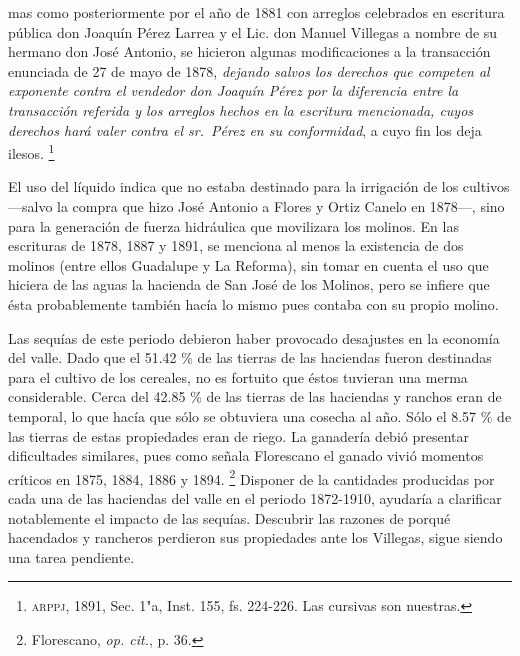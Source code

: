 \documentclass[14pt,twoside,final]{extbook} %
\let\oldfootnote\footnote
\renewcommand\footnote[1]{%
\oldfootnote{\hspace{1mm}#1}}
\begin{document}
\begin{quoting}
mas como posteriormente por el año de 1881 con arreglos celebrados en escritura pública don Joaquín Pérez Larrea y el Lic. don Manuel Villegas a nombre de su hermano don José Antonio, se hicieron algunas modificaciones a la transacción enunciada de 27 de mayo de 1878, \emph{dejando salvos los derechos que competen al exponente contra el vendedor don Joaquín Pérez por la diferencia entre la transacción referida y los arreglos hechos en la escritura mencionada, cuyos derechos hará valer contra el sr.~Pérez en su conformidad}, a cuyo fin los deja ilesos.\footnote{\textsc{arppj}, 1891, Sec. 1"a, Inst. 155, fs. 224-226. Las cursivas son nuestras.}
\end{quoting}
El uso del líquido indica que no estaba destinado para la irrigación de los cultivos ---salvo la compra que hizo José Antonio a Flores y Ortiz Canelo en 1878---, sino para la generación de fuerza hidráulica que movilizara los molinos. En las escrituras de 1878, 1887 y 1891, se menciona al menos la existencia de dos molinos (entre ellos Guadalupe y La Reforma), sin tomar en cuenta el uso que hiciera de las aguas la hacienda de San José de los Molinos, pero se infiere que ésta probablemente
también hacía lo mismo pues contaba con su propio molino.

Las sequías de este periodo debieron haber provocado desajustes en la economía del valle. Dado que el 51.42 \% de las tierras de las haciendas fueron destinadas para el cultivo de los cereales, no es fortuito que éstos tuvieran una merma considerable. Cerca del 42.85 \% de las tierras de las haciendas y ranchos eran de temporal, lo que hacía que sólo se obtuviera una cosecha al año. Sólo el 8.57 \% de las tierras de estas propiedades eran de riego. La ganadería debió presentar dificultades similares, pues como señala Florescano el ganado vivió momentos críticos en 1875, 1884, 1886 y 1894.\footnote{Florescano, \emph{op. cit.}, p. 36.} Disponer de la cantidades producidas por cada una de las haciendas del valle en el periodo 1872-1910, ayudaría a clarificar notablemente el impacto de las sequías. Descubrir las razones de porqué hacendados y rancheros perdieron sus propiedades ante los Villegas, sigue siendo una tarea pendiente.
\end{document}
